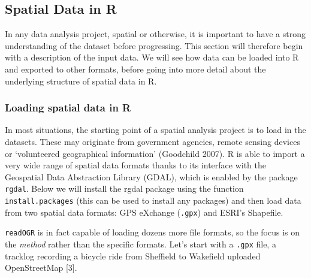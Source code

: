 \documentclass[]{article}
\begin{document}
\subsection{Spatial Data in R}

In any data analysis project, spatial or otherwise, it is important to
have a strong understanding of the dataset before progressing. This
section will therefore begin with a description of the input data. We
will see how data can be loaded into R and exported to other formats,
before going into more detail about the underlying structure of spatial
data in R.

\subsubsection{Loading spatial data in R}

In most situations, the starting point of a spatial analysis project is
to load in the datasets. These may originate from government agencies,
remote sensing devices or `volunteered geographical information'
(Goodchild 2007). R is able to import a very wide range of spatial data
formats thanks to its interface with the Geospatial Data Abstraction
Library (GDAL), which is enabled by the package \texttt{rgdal}. Below we
will install the rgdal package using the function
\texttt{install.packages} (this can be used to install any packages) and
then load data from two spatial data formats: GPS eXchange
(\texttt{.gpx}) and ESRI's Shapefile.

\texttt{readOGR} is in fact capable of loading dozens more file formats,
so the focus is on the \emph{method} rather than the specific formats.
Let's start with a \texttt{.gpx} file, a tracklog recording a bicycle
ride from Sheffield to Wakefield uploaded OpenStreetMap {[}3{]}.
\end{document}
